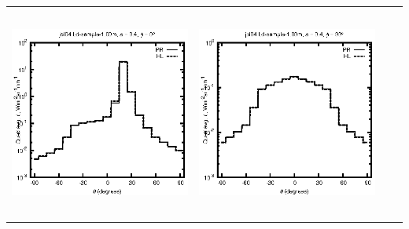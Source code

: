 \begin{tabular}{c c c c}
\includegraphics[height=7cm]{../eps/jol04_Ld_sample_1.00m_fwd.eps} &
\includegraphics[height=7cm]{../eps/jol04_Ld_sample_1.00m_cross.eps} \\
\end{tabular}

\pagebreak

